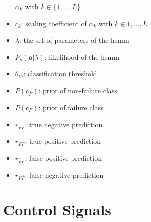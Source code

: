 \documentclass[mscthesis]{usiinfthesis}
\begin{document}
\begin{itemize}
        $\alpha_k$ with $k \in \{1, \dots, L\}$
    \item $c_k$: scaling coefficient of $\alpha_k$ with $k \in {1, \dots, L}$
    \item $\lambda$: the set of parameters of the \acrshort{hsmm}
    \item $P_s(\boldsymbol{o}|\lambda)$: likelihood of the \acrshort{hsmm}
    \item $\theta_{th}$: classification threshold
    \item $P(c_{\bar{F}})$: prior of non-failure class
    \item $P(c_F) $: prior of failure class
    \item $r_{\bar{F}\bar{F}}$: true negative prediction
    \item $r_{FF}$: true positive prediction
    \item $r_{\bar{F}F}$: false positive prediction
    \item $r_{F\bar{F}}$: false negative prediction
\end{itemize}

\chapter{Control Signals}
\end{document}

